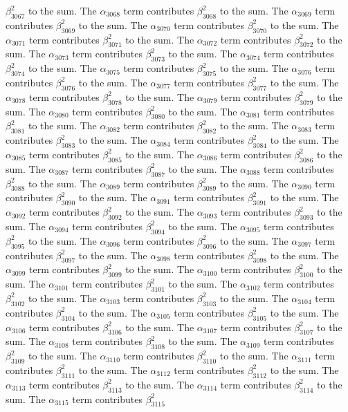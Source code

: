 \begin{lemma}
$\beta_{3067}^{2}$ to the sum. The $\alpha_{3068}$ term contributes $\beta_{3068}^{2}$ to the sum. The $\alpha_{3069}$ term contributes $\beta_{3069}^{2}$ to the sum. The $\alpha_{3070}$ term contributes $\beta_{3070}^{2}$ to the sum. The $\alpha_{3071}$ term contributes $\beta_{3071}^{2}$ to the sum. The $\alpha_{3072}$ term contributes $\beta_{3072}^{2}$ to the sum. The $\alpha_{3073}$ term contributes $\beta_{3073}^{2}$ to the sum. The $\alpha_{3074}$ term contributes $\beta_{3074}^{2}$ to the sum. The $\alpha_{3075}$ term contributes $\beta_{3075}^{2}$ to the sum. The $\alpha_{3076}$ term contributes $\beta_{3076}^{2}$ to the sum. The $\alpha_{3077}$ term contributes $\beta_{3077}^{2}$ to the sum. The $\alpha_{3078}$ term contributes $\beta_{3078}^{2}$ to the sum. The $\alpha_{3079}$ term contributes $\beta_{3079}^{2}$ to the sum. The $\alpha_{3080}$ term contributes $\beta_{3080}^{2}$ to the sum. The $\alpha_{3081}$ term contributes $\beta_{3081}^{2}$ to the sum. The $\alpha_{3082}$ term contributes $\beta_{3082}^{2}$ to the sum. The $\alpha_{3083}$ term contributes $\beta_{3083}^{2}$ to the sum. The $\alpha_{3084}$ term contributes $\beta_{3084}^{2}$ to the sum. The $\alpha_{3085}$ term contributes $\beta_{3085}^{2}$ to the sum. The $\alpha_{3086}$ term contributes $\beta_{3086}^{2}$ to the sum. The $\alpha_{3087}$ term contributes $\beta_{3087}^{2}$ to the sum. The $\alpha_{3088}$ term contributes $\beta_{3088}^{2}$ to the sum. The $\alpha_{3089}$ term contributes $\beta_{3089}^{2}$ to the sum. The $\alpha_{3090}$ term contributes $\beta_{3090}^{2}$ to the sum. The $\alpha_{3091}$ term contributes $\beta_{3091}^{2}$ to the sum. The $\alpha_{3092}$ term contributes $\beta_{3092}^{2}$ to the sum. The $\alpha_{3093}$ term contributes $\beta_{3093}^{2}$ to the sum. The $\alpha_{3094}$ term contributes $\beta_{3094}^{2}$ to the sum. The $\alpha_{3095}$ term contributes $\beta_{3095}^{2}$ to the sum. The $\alpha_{3096}$ term contributes $\beta_{3096}^{2}$ to the sum. The $\alpha_{3097}$ term contributes $\beta_{3097}^{2}$ to the sum. The $\alpha_{3098}$ term contributes $\beta_{3098}^{2}$ to the sum. The $\alpha_{3099}$ term contributes $\beta_{3099}^{2}$ to the sum. The $\alpha_{3100}$ term contributes $\beta_{3100}^{2}$ to the sum. The $\alpha_{3101}$ term contributes $\beta_{3101}^{2}$ to the sum. The $\alpha_{3102}$ term contributes $\beta_{3102}^{2}$ to the sum. The $\alpha_{3103}$ term contributes $\beta_{3103}^{2}$ to the sum. The $\alpha_{3104}$ term contributes $\beta_{3104}^{2}$ to the sum. The $\alpha_{3105}$ term contributes $\beta_{3105}^{2}$ to the sum. The $\alpha_{3106}$ term contributes $\beta_{3106}^{2}$ to the sum. The $\alpha_{3107}$ term contributes $\beta_{3107}^{2}$ to the sum. The $\alpha_{3108}$ term contributes $\beta_{3108}^{2}$ to the sum. The $\alpha_{3109}$ term contributes $\beta_{3109}^{2}$ to the sum. The $\alpha_{3110}$ term contributes $\beta_{3110}^{2}$ to the sum. The $\alpha_{3111}$ term contributes $\beta_{3111}^{2}$ to the sum. The $\alpha_{3112}$ term contributes $\beta_{3112}^{2}$ to the sum. The $\alpha_{3113}$ term contributes $\beta_{3113}^{2}$ to the sum. The $\alpha_{3114}$ term contributes $\beta_{3114}^{2}$ to the sum. The $\alpha_{3115}$ term contributes $\beta_{3115}^{2}$ 
\end{lemma}
